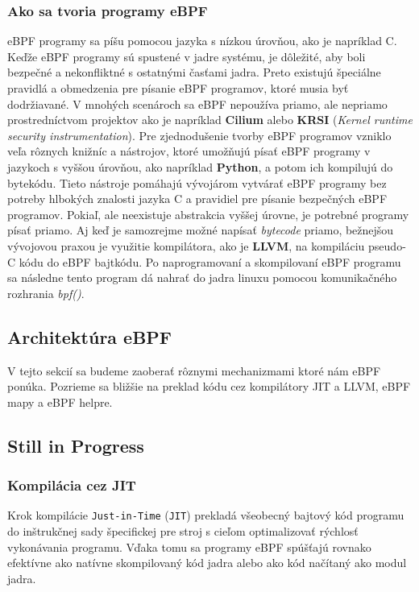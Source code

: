 \subsubsection{Ako sa tvoria programy eBPF}
eBPF programy sa píšu pomocou jazyka s nízkou úrovňou, ako je napríklad C. Keďže eBPF programy sú spustené v jadre systému, je dôležité, 
aby boli bezpečné a nekonfliktné s ostatnými časťami jadra. Preto existujú špeciálne pravidlá a obmedzenia pre písanie eBPF programov, 
ktoré musia byť dodržiavané. V mnohých scenároch sa eBPF nepoužíva priamo, ale nepriamo prostredníctvom projektov ako je napríklad 
\textbf{Cilium} alebo \textbf{KRSI} (\emph{Kernel runtime security instrumentation}). Pre zjednodušenie tvorby eBPF programov vzniklo veľa rôznych 
knižníc a nástrojov, ktoré umožňujú písať eBPF programy v jazykoch s vyššou úrovňou, ako napríklad \textbf{Python}, a potom ich kompilujú do bytekódu. 
Tieto nástroje pomáhajú vývojárom vytvárať eBPF programy bez potreby hlbokých znalosti jazyka C a pravidiel pre písanie bezpečných eBPF programov. 
Pokiaľ, ale neexistuje abstrakcia vyššej úrovne, je potrebné programy písať priamo. Aj keď je samozrejme možné napísať \emph{bytecode} priamo, 
bežnejšou vývojovou praxou je využitie kompilátora, ako je \textbf{LLVM}, na kompiláciu pseudo-C kódu do eBPF bajtkódu. 
Po naprogramovaní a skompilovaní eBPF programu sa následne tento program dá nahrať do jadra linuxu pomocou komunikačného rozhrania \emph{bpf()}.~\cite{eBPF}
\pagebreak

\subsection{Architektúra eBPF}
\label{sec:architecture}
V tejto sekcií sa budeme zaoberať rôznymi mechanizmami ktoré nám eBPF ponúka. Pozrieme sa bližšie na preklad kódu cez 
kompilátory JIT a LLVM, eBPF mapy a eBPF helpre. 

\subsection{Still in Progress}

\subsubsection{Kompilácia cez JIT}
Krok kompilácie \texttt{Just-in-Time} (\texttt{JIT}) prekladá všeobecný bajtový kód programu do inštrukčnej sady špecifickej pre 
stroj s cieľom optimalizovať rýchlosť vykonávania programu. Vďaka tomu sa programy eBPF spúšťajú rovnako efektívne ako natívne 
skompilovaný kód jadra alebo ako kód načítaný ako modul jadra.

